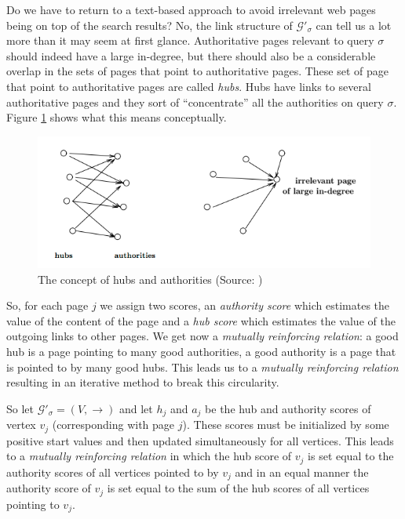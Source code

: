 \documentclass[a4paper,11pt]{report}
\newcommand{\graf}{\mathscr{G}}
\begin{document}
 Do we have to return to a text-based approach to avoid irrelevant web pages 
 being on top of the search results? No, the link structure of $\graf'_\sigma$ 
 can tell us a lot more than it may seem at first glance.  Authoritative pages 
 relevant to query $\sigma$ should indeed have a large in-degree, but there should also be a considerable overlap in the sets 
 of pages that point to authoritative pages. These set of page that point to 
 authoritative pages are called \textit{hubs}. Hubs have links to several 
 authoritative pages and they sort of ``concentrate'' all the authorities on 
 query $\sigma$. Figure \ref{hubauth} shows what this means conceptually.
 \begin{figure}[h!]
  \centering
  \includegraphics[scale=0.6]{hubauth.png}\caption{The concept of hubs and authorities (Source: \cite{kleinberg})}\label{hubauth}
\end{figure}
 
 So, for each page $j$ we assign two scores, an \textit{authority score} 
 which estimates the value of the content of the page and a \textit{hub 
 score} which estimates the value of the outgoing links to other pages. We get now a\textit{ mutually reinforcing 
 relation}: a good hub is a page pointing to many good authorities, a good 
 authority is a page that is pointed to by many good hubs. This leads us to a 
 \textit{mutually reinforcing relation} resulting in an iterative method to 
 break this circularity.
 
So let $\graf'_\sigma = (V,\to)$ and let $h_j$ and $a_j$ be the hub and authority 
scores of vertex $v_j$ (corresponding with page $j$). These scores must be initialized by some positive start values 
and then updated simultaneously for all vertices. This leads to a \emph{mutually reinforcing relation} 
in which the hub score of $v_j$ is set equal to the authority scores of all 
vertices pointed to by $v_j$ and in an equal manner the authority score of $v_j$ 
is set equal to the sum of the hub scores of all vertices pointing to $v_j$.
\end{document}
